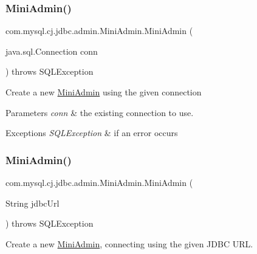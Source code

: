 \subsubsection{\texorpdfstring{Mini\+Admin()}{MiniAdmin()}\hspace{0.1cm}{\footnotesize\ttfamily [1/3]}}
{\footnotesize\ttfamily com.\+mysql.\+cj.\+jdbc.\+admin.\+Mini\+Admin.\+Mini\+Admin (\begin{DoxyParamCaption}\item[{java.\+sql.\+Connection}]{conn }\end{DoxyParamCaption}) throws S\+Q\+L\+Exception}

Create a new \mbox{\hyperlink{classcom_1_1mysql_1_1cj_1_1jdbc_1_1admin_1_1_mini_admin}{Mini\+Admin}} using the given connection


\begin{DoxyParams}{Parameters}
{\em conn} & the existing connection to use.\\
\hline
\end{DoxyParams}

\begin{DoxyExceptions}{Exceptions}
{\em S\+Q\+L\+Exception} & if an error occurs \\
\hline
\end{DoxyExceptions}
\mbox{\label{classcom_1_1mysql_1_1cj_1_1jdbc_1_1admin_1_1_mini_admin_a97a6c10c257dd29ed685e3486d478c65}} 
\subsubsection{\texorpdfstring{Mini\+Admin()}{MiniAdmin()}\hspace{0.1cm}{\footnotesize\ttfamily [2/3]}}
{\footnotesize\ttfamily com.\+mysql.\+cj.\+jdbc.\+admin.\+Mini\+Admin.\+Mini\+Admin (\begin{DoxyParamCaption}\item[{String}]{jdbc\+Url }\end{DoxyParamCaption}) throws S\+Q\+L\+Exception}

Create a new \mbox{\hyperlink{classcom_1_1mysql_1_1cj_1_1jdbc_1_1admin_1_1_mini_admin}{Mini\+Admin}}, connecting using the given J\+D\+BC U\+RL.


